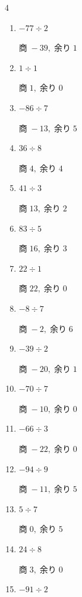 \begin{multicols}{4}
\begin{enumerate}
  \item $-77 \div 2$

        $商\; -39,\; 余り\; 1$

  \item $1 \div 1$

        $商\; 1,\; 余り\; 0$

  \item $-86 \div 7$

        $商\; -13,\; 余り\; 5$

  \item $36 \div 8$

        $商\; 4,\; 余り\; 4$

  \item $41 \div 3$

        $商\; 13,\; 余り\; 2$

  \item $83 \div 5$

        $商\; 16,\; 余り\; 3$

  \item $22 \div 1$

        $商\; 22,\; 余り\; 0$

  \item $-8 \div 7$

        $商\; -2,\; 余り\; 6$

  \item $-39 \div 2$

        $商\; -20,\; 余り\; 1$

  \item $-70 \div 7$

        $商\; -10,\; 余り\; 0$

\columnbreak %

\resetques

  \item $-66 \div 3$

        $商\; -22,\; 余り\; 0$

  \item $-94 \div 9$

        $商\; -11,\; 余り\; 5$

  \item $5 \div 7$

        $商\; 0,\; 余り\; 5$

  \item $24 \div 8$

        $商\; 3,\; 余り\; 0$

  \item $-91 \div 2$


\end{enumerate}
\end{multicols}
